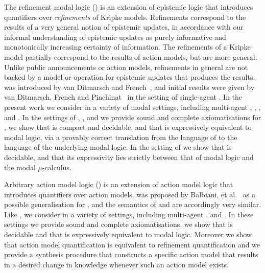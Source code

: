 The refinement modal logic (\logicRml{}) is an extension of epistemic logic that introduces quantifiers over {\em refinements} of Kripke models.
Refinements correspond to the results of a very general notion of epistemic updates, in accordance with our informal understanding of epistemic updates as purely informative and monotonically increasing certainty of information.
The refinements of a Kripke model partially correspond to the results of action models, but are more general.
Unlike public announcements or action models, refinements in general are not backed by a model or operation for epistemic updates that produces the results.
\logicRml{} was introduced by van Ditmarsch and French~\cite{vanditmarsch:2009}, and initial results were given by van Ditmarsch, French and Pinchinat~\cite{vanditmarsch:2010} in the setting of single-agent \classK{}.
In the present work we consider \logicRml{} in a variety of modal settings, including multi-agent \classK{}, \classKF{}, \classKFF{}, \classKD{} and \classS{}.
In the settings of \classK{}, \classKFF{}, \classKD{} and \classS{} we provide sound and complete axiomatisations for \logicRml{}, we show that \logicRml{} is compact and decidable, and that \logicRml{} is expressively equivalent to modal logic, via a provably correct translation from the language of \logicRml{} to the language of the underlying modal logic.
In the setting of \classKF{} we show that \logicRml{} is decidable, and that its expressivity lies strictly between that of modal logic and the modal $\mu$-calculus.

Arbitrary action model logic (\logicAaml{}) is an extension of action model logic that introduces quantifiers over action models.
\logicAaml{} was proposed by Balbiani, et al.~\cite{balbiani:2007} as a possible generalisation for \logicApal{}, and the semantics of \logicAaml{} and \logicApal{} are accordingly very similar.
Like \logicRml{}, we consider \logicAaml{} in a variety of settings, including multi-agent \classK{}, \classKFF{} and \classS{}.
In these settings we provide sound and complete axiomatisations, we show that \logicAaml{} is decidable and that \logicAaml{} is expressively equivalent to modal logic.
Moreover we show that action model quantification is equivalent to refinement quantification and we provide a synthesis procedure that constructs a specific action model that results in a desired change in knowledge whenever such an action model exists.

